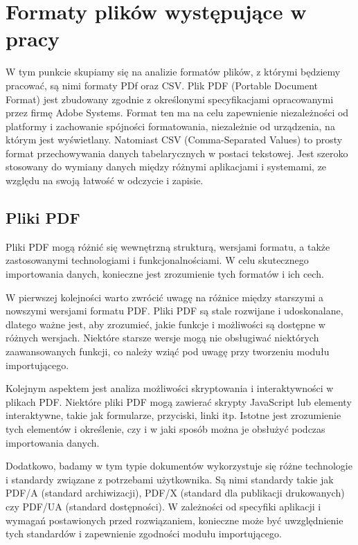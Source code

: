 \documentclass[a4paper,twoside,12pt]{book}
\begin{document}
\section{Formaty plików występujące w pracy}

W tym punkcie skupiamy się na analizie formatów plików, z którymi będziemy pracować, są nimi formaty PDf oraz CSV. Plik PDF (Portable Document Format) jest zbudowany zgodnie z określonymi specyfikacjami opracowanymi przez firmę Adobe Systems. Format ten ma na celu zapewnienie niezależności od platformy i zachowanie spójności formatowania, niezależnie od urządzenia, na którym jest wyświetlany. Natomiast CSV (Comma-Separated Values) to prosty format przechowywania danych tabelarycznych w postaci tekstowej. Jest szeroko stosowany do wymiany danych między różnymi aplikacjami i systemami, ze względu na swoją łatwość w odczycie i zapisie.

\subsection{Pliki PDF}

Pliki PDF mogą różnić się wewnętrzną strukturą, wersjami formatu, a także zastosowanymi technologiami i funkcjonalnościami. W celu skutecznego importowania danych, konieczne jest zrozumienie tych formatów i ich cech.

W pierwszej kolejności warto zwrócić uwagę na różnice między starszymi a nowszymi wersjami formatu PDF. Pliki PDF są stale rozwijane i udoskonalane, dlatego ważne jest, aby zrozumieć, jakie funkcje i możliwości są dostępne w różnych wersjach. Niektóre starsze wersje mogą nie obsługiwać niektórych zaawansowanych funkcji, co należy wziąć pod uwagę przy tworzeniu modułu importującego.

Kolejnym aspektem jest analiza możliwości skryptowania i interaktywności w plikach PDF. Niektóre pliki PDF mogą zawierać skrypty JavaScript lub elementy interaktywne, takie jak formularze, przyciski, linki itp. Istotne jest zrozumienie tych elementów i określenie, czy i w jaki sposób można je obsłużyć podczas importowania danych.

Dodatkowo, badamy w tym typie dokumentów wykorzystuje się różne technologie i standardy związane z potrzebami użytkownika. Są nimi standardy takie jak PDF/A (standard archiwizacji), PDF/X (standard dla publikacji drukowanych) czy PDF/UA (standard dostępności). W zależności od specyfiki aplikacji i wymagań postawionych przed rozwiązaniem, konieczne może być uwzględnienie tych standardów i zapewnienie zgodności modułu importującego.
\end{document}
